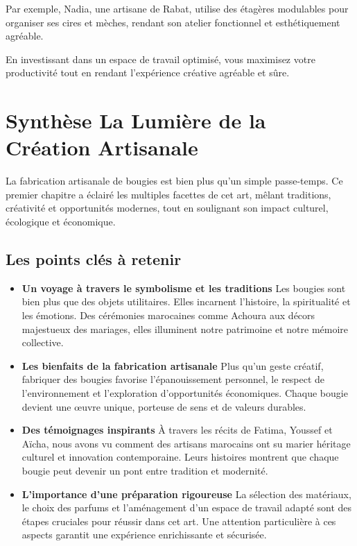 \documentclass[11pt,fleqn,onecolumn,oneside]{book}
\begin{document}
\begin{example}
Par exemple, Nadia, une artisane de Rabat, utilise des étagères modulables pour organiser ses cires et mèches, rendant son atelier fonctionnel et esthétiquement agréable.
\end{example}

\noindent
En investissant dans un espace de travail optimisé, vous maximisez votre productivité tout en rendant l’expérience créative agréable et sûre.


\section{Synthèse La Lumière de la Création Artisanale}

\begin{definition}
La fabrication artisanale de bougies est bien plus qu’un simple passe-temps. Ce premier chapitre a éclairé les multiples facettes de cet art, mêlant traditions, créativité et opportunités modernes, tout en soulignant son impact culturel, écologique et économique.
\end{definition}

\subsection*{Les points clés à retenir}

\begin{itemize}
    \item \textbf{Un voyage à travers le symbolisme et les traditions} 
    Les bougies sont bien plus que des objets utilitaires. Elles incarnent l’histoire, la spiritualité et les émotions. Des cérémonies marocaines comme Achoura aux décors majestueux des mariages, elles illuminent notre patrimoine et notre mémoire collective.
    
    \item \textbf{Les bienfaits de la fabrication artisanale} 
    Plus qu’un geste créatif, fabriquer des bougies favorise l’épanouissement personnel, le respect de l’environnement et l’exploration d’opportunités économiques. Chaque bougie devient une œuvre unique, porteuse de sens et de valeurs durables.
    
    \item \textbf{Des témoignages inspirants} 
    À travers les récits de Fatima, Youssef et Aïcha, nous avons vu comment des artisans marocains ont su marier héritage culturel et innovation contemporaine. Leurs histoires montrent que chaque bougie peut devenir un pont entre tradition et modernité.
    
    \item \textbf{L’importance d’une préparation rigoureuse} 
    La sélection des matériaux, le choix des parfums et l’aménagement d’un espace de travail adapté sont des étapes cruciales pour réussir dans cet art. Une attention particulière à ces aspects garantit une expérience enrichissante et sécurisée.
\end{itemize}
\end{document}
